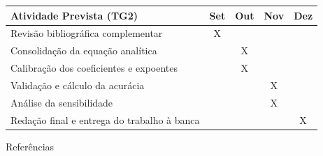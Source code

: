 \documentclass[12pt,openany]{report}
\begin{document}
\vspace{1.0cm}
\begin{table}[h]
\centering
\small
\begin{tabularx}{\textwidth}{Xcccc}
\toprule
\textbf{Atividade Prevista (TG2)} & \textbf{Set} & \textbf{Out} & \textbf{Nov} & \textbf{Dez} \\ \midrule
Revisão bibliográfica complementar & X & & & \\
Consolidação da equação analítica & & X & & \\
Calibração dos coeficientes e expoentes & & X & & \\
Validação e cálculo da acurácia & & & X & \\
Análise da sensibilidade & & & X & \\
Redação final e entrega do trabalho à banca & & & & X \\ \bottomrule
\end{tabularx}
\end{table}

\newpage

\begin{center}
    {\selectfont\Huge Referências\par}
\end{center}
\vspace{0.5cm}
\end{document}
